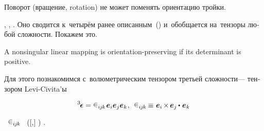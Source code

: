 \begin{otherlanguage}{russian}

{\small Поворот (вращение, rotation) не может поменять ориентацию тройки.}

,   , .
Оно сводится к~четырём ранее описанным~() и~обобщается на~тензоры любой сложности. Покажем это.

{\small A nonsingular linear mapping is orientation-preserving if its determinant is positive.}

Для этого познакомимся с~волюметрическим тензором третьей сложности\:--- тензором Levi\hbox{-}Civita\hspace{-0.1ex}’ы

\nopagebreak\vspace{-0.15em}\begin{equation}\label{levicivitaintro}
\levicivitatensor = \levicivita_{i\hspace{-0.1ex}j\hspace{-0.1ex}k} \hspace{.2ex} \bm{e}_i \bm{e}_j \bm{e}_k \hspace{.1ex}, \:\:
\levicivita_{i\hspace{-0.1ex}j\hspace{-0.1ex}k} \hspace{-0.12ex} \equiv \hspace{.1ex} \bm{e}_i \hspace{-0.2ex} \times \hspace{-0.2ex} \bm{e}_j \hspace{-0.1ex} \dotp \hspace{.12ex} \bm{e}_k
\end{equation}

\nopagebreak \vspace{-0.1em} \noindent
{}~${\levicivita_{i\hspace{-0.1ex}j\hspace{-0.1ex}k}}$\ru{,}  ~([,] )
 .


\end{otherlanguage}
